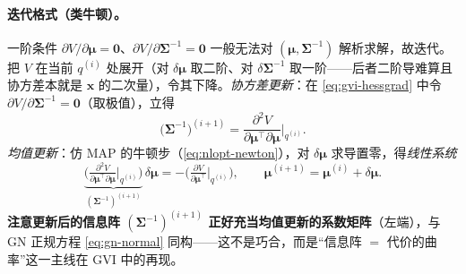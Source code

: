 \paragraph{迭代格式（类牛顿）。}
一阶条件 $\partial V/\partial\boldsymbol{\mu}=\mathbf{0}$、$\partial V/\partial\boldsymbol{\Sigma}^{-1}=\mathbf{0}$ 一般无法对 $(\boldsymbol{\mu},\boldsymbol{\Sigma}^{-1})$ 解析求解，故迭代。把 $V$ 在当前 $q^{(i)}$ 处展开（对 $\delta\boldsymbol{\mu}$ 取二阶、对 $\delta\boldsymbol{\Sigma}^{-1}$ 取一阶——后者二阶导难算且协方差本就是 $\mathbf{x}$ 的二次量），令其下降。\emph{协方差更新}：在 \cref{eq:gvi-hessgrad} 中令 $\partial V/\partial\boldsymbol{\Sigma}^{-1}=\mathbf{0}$（取极值），立得
\begin{equation}
  \big(\boldsymbol{\Sigma}^{-1}\big)^{(i+1)}=\frac{\partial^2 V}{\partial\boldsymbol{\mu}^\top\partial\boldsymbol{\mu}}\bigg|_{q^{(i)}}.
  \label{eq:gvi-cov-update}
\end{equation}
\emph{均值更新}：仿 MAP 的牛顿步（\cref{eq:nlopt-newton}），对 $\delta\boldsymbol{\mu}$ 求导置零，得\emph{线性系统}
\begin{equation}
  \underbrace{\Big(\tfrac{\partial^2 V}{\partial\boldsymbol{\mu}^\top\partial\boldsymbol{\mu}}\big|_{q^{(i)}}\Big)}_{(\boldsymbol{\Sigma}^{-1})^{(i+1)}}\,\delta\boldsymbol{\mu}=-\Big(\tfrac{\partial V}{\partial\boldsymbol{\mu}^\top}\big|_{q^{(i)}}\Big),\qquad \boldsymbol{\mu}^{(i+1)}=\boldsymbol{\mu}^{(i)}+\delta\boldsymbol{\mu}.
  \label{eq:gvi-mean-update}
\end{equation}
\textbf{注意更新后的信息阵 $(\boldsymbol{\Sigma}^{-1})^{(i+1)}$ 正好充当均值更新的系数矩阵}（左端），与 GN 正规方程 \cref{eq:gn-normal} 同构——这不是巧合，而是“信息阵 $=$ 代价的曲率”这一主线在 GVI 中的再现。

